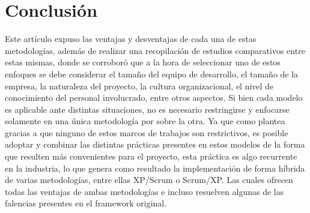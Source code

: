 \documentclass[a4paper,10pt]{article}
\begin{document}
	\section{Conclusión}
	Este artículo expuso las ventajas y desventajas de cada una de estas metodologías, además de realizar una recopilación de estudios comparativos entre estas mismas, donde se corroboró que a la hora de seleccionar uno de estos enfoques se debe considerar el tamaño del equipo de desarrollo, el tamaño de la empresa, la naturaleza del proyecto, la cultura organizacional, el nivel de conocimiento del personal involucrado, entre otros aspectos. Si bien cada modelo es aplicable ante distintas situaciones, no es necesario restringirse y enfocarse solamente en una única metodología por sobre la otra. Ya que como plantea \textcite{bahit2012scrum} gracias a que ninguno de estos marcos de trabajos son restrictivos, es posible adoptar y combinar las distintas prácticas presentes en estos modelos de la forma que resulten más convenientes para el proyecto, esta práctica es algo recurrente en la industria, lo que genera como resultado la implementación de forma híbrida de varias metodologías, entre ellas XP/Scrum o Scrum/XP. Las cuales ofrecen todas las ventajas de ambas metodologías e incluso resuelven algunas de las falencias presentes en el framework original.
	
	\nocite{*}
	\printbibliography[heading=bibintoc]
\end{document}
